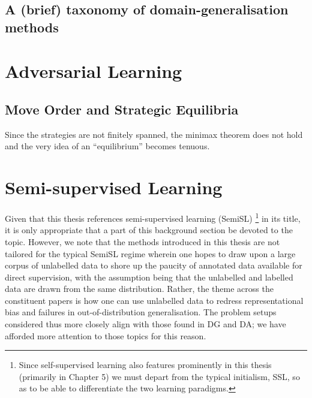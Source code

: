 \subsection{A (brief) taxonomy of domain-generalisation methods}
%

\section{Adversarial Learning}\label{sec:adv-learning}
\cite{GooAbaMirXuetal14}
\subsection{Move Order and Strategic Equilibria} 
Since the strategies are not finitely spanned, the
minimax theorem does not hold and the very idea of an ``equilibrium'' becomes tenuous.


\section{ Semi-supervised Learning }\label{sec:SemiSL}
 
Given that this thesis references semi-supervised learning (SemiSL)
\footnote{
Since self-supervised learning also features prominently in this thesis (primarily in Chapter 5) we
must depart from the typical initialism, SSL, so as to be able to differentiate the two learning
paradigms.
}
in its title, it is only appropriate that a part of this background section be devoted to the
topic.
%
However, we note that the methods introduced in this thesis are not tailored for the typical SemiSL
regime wherein one hopes to draw upon a large corpus of unlabelled data to shore up the paucity of
annotated data available for direct supervision, with the assumption being that the unlabelled and
labelled data are drawn from the same distribution.
%
Rather, the theme across the constituent papers is how one can use unlabelled data to redress
representational bias and failures in out-of-distribution generalisation. 
%
The problem setups considered thus more closely align with those found in DG and DA; we have
afforded more attention to those topics for this reason.

